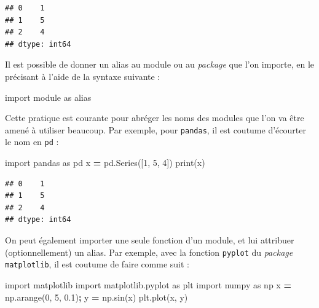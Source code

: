 \documentclass[
  12pt,
]{book}
\newenvironment{Shaded}{\begin{snugshade}}{\end{snugshade}}
\newcommand{\BuiltInTok}[1]{#1}
\newcommand{\DecValTok}[1]{\textcolor[rgb]{0.00,0.00,0.81}{#1}}
\newcommand{\FloatTok}[1]{\textcolor[rgb]{0.00,0.00,0.81}{#1}}
\newcommand{\ImportTok}[1]{#1}
\newcommand{\NormalTok}[1]{#1}
\newcommand{\OperatorTok}[1]{\textcolor[rgb]{0.81,0.36,0.00}{\textbf{#1}}}
\numberwithin{equation}{section}
\numberwithin{countremarque}{section}
\begin{document}
\begin{lstlisting}
## 0    1
## 1    5
## 2    4
## dtype: int64
\end{lstlisting}

Il est possible de donner un alias au module ou au \emph{package} que l'on importe, en le précisant à l'aide de la syntaxe suivante :

\begin{Shaded}
\begin{Highlighting}[]
\ImportTok{import}\NormalTok{ module }\ImportTok{as}\NormalTok{ alias}
\end{Highlighting}
\end{Shaded}

Cette pratique est courante pour abréger les noms des modules que l'on va être amené à utiliser beaucoup. Par exemple, pour \texttt{pandas}, il est coutume d'écourter le nom en \texttt{pd} :

\begin{Shaded}
\begin{Highlighting}[]
\ImportTok{import}\NormalTok{ pandas }\ImportTok{as}\NormalTok{ pd}
\NormalTok{x }\OperatorTok{=}\NormalTok{ pd.Series([}\DecValTok{1}\NormalTok{, }\DecValTok{5}\NormalTok{, }\DecValTok{4}\NormalTok{])}
\BuiltInTok{print}\NormalTok{(x)}
\end{Highlighting}
\end{Shaded}

\begin{lstlisting}
## 0    1
## 1    5
## 2    4
## dtype: int64
\end{lstlisting}

On peut également importer une seule fonction d'un module, et lui attribuer (optionnellement) un alias. Par exemple, avec la fonction \texttt{pyplot} du \emph{package} \texttt{matplotlib}, il est coutume de faire comme suit :

\begin{Shaded}
\begin{Highlighting}[]
\ImportTok{import}\NormalTok{ matplotlib}
\ImportTok{import}\NormalTok{ matplotlib.pyplot  }\ImportTok{as}\NormalTok{ plt}
\ImportTok{import}\NormalTok{ numpy  }\ImportTok{as}\NormalTok{ np}
\NormalTok{x }\OperatorTok{=}\NormalTok{ np.arange(}\DecValTok{0}\NormalTok{, }\DecValTok{5}\NormalTok{, }\FloatTok{0.1}\NormalTok{)}\OperatorTok{;}
\NormalTok{y }\OperatorTok{=}\NormalTok{ np.sin(x)}
\NormalTok{plt.plot(x, y)}
\end{Highlighting}
\end{Shaded}
\end{document}
